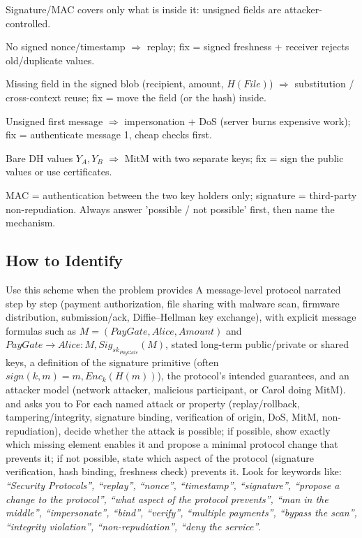 \documentclass[12pt, a4paper]{article}
\begin{document}
\begin{theorybox}
\begin{tightitem}
    \item Signature/MAC covers only what is inside it: unsigned fields are attacker-controlled.
    \item No signed nonce/timestamp $\Rightarrow$ replay; fix = signed freshness + receiver rejects old/duplicate values.
    \item Missing field in the signed blob (recipient, amount, $H(File)$) $\Rightarrow$ substitution / cross-context reuse; fix = move the field (or the hash) inside.
    \item Unsigned first message $\Rightarrow$ impersonation + DoS (server burns expensive work); fix = authenticate message 1, cheap checks first.
    \item Bare DH values $Y_A, Y_B$ $\Rightarrow$ MitM with two separate keys; fix = sign the public values or use certificates.
    \item MAC = authentication between the two key holders only; signature = third-party non-repudiation. Always answer 'possible / not possible' first, then name the mechanism.
\end{tightitem}
\end{theorybox}

\subsection*{How to Identify}
Use this scheme when the problem provides A message-level protocol narrated step by step (payment authorization, file sharing with malware scan, firmware distribution, submission/ack, Diffie--Hellman key exchange), with explicit message formulas such as $M = (PayGate, Alice, Amount)$ and $PayGate \to Alice : M, Sig_{sk_{PayGate}}(M)$, stated long-term public/private or shared keys, a definition of the signature primitive (often $sign(k, m) = m, Enc_k(H(m))$), the protocol's intended guarantees, and an attacker model (network attacker, malicious participant, or Carol doing MitM). and asks you to For each named attack or property (replay/rollback, tampering/integrity, signature binding, verification of origin, DoS, MitM, non-repudiation), decide whether the attack is possible; if possible, show exactly which missing element enables it and propose a minimal protocol change that prevents it; if not possible, state which aspect of the protocol (signature verification, hash binding, freshness check) prevents it. Look for keywords like: \textit{``Security Protocols'', ``replay'', ``nonce'', ``timestamp'', ``signature'', ``propose a change to the protocol'', ``what aspect of the protocol prevents'', ``man in the middle'', ``impersonate'', ``bind'', ``verify'', ``multiple payments'', ``bypass the scan'', ``integrity violation'', ``non-repudiation'', ``deny the service''}.
\end{document}
